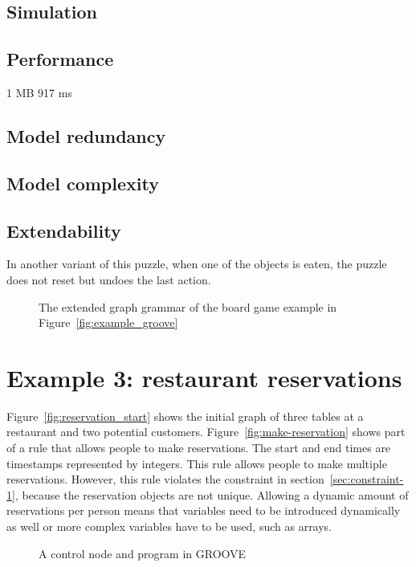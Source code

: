 \subsection{Simulation}


\subsection{Performance}
1 MB 917 ms

\subsection{Model redundancy}


\subsection{Model complexity}


\subsection{Extendability}
In another variant of this puzzle, when one of the objects is eaten, the puzzle does not reset but undoes the last action. 

\begin{figure}[ht]
  \begin{center}
    
  \end{center}
  \caption{The extended graph grammar of the board game example in Figure~\ref{fig:example_groove}}
  \label{fig:gg-fwgc-extended}
\end{figure}

\section{Example 3: restaurant reservations}
Figure~\ref{fig:reservation_start} shows the initial graph of three tables at a restaurant and two potential customers. Figure~\ref{fig:make-reservation} shows part of a rule that allows people to make reservations. The start and end times are timestamps represented by integers. This rule allows people to make multiple reservations. However, this rule violates the constraint in section~\ref{sec:constraint-1}, because the reservation objects are not unique. Allowing a dynamic amount of reservations per person means that variables need to be introduced dynamically as well or more complex variables have to be used, such as arrays. 

\begin{figure}[ht]
  \begin{center}
    \hspace{20px}
  \end{center}
  \caption{A control node and program in GROOVE}
  \label{fig:priority_gg}
\end{figure} 

